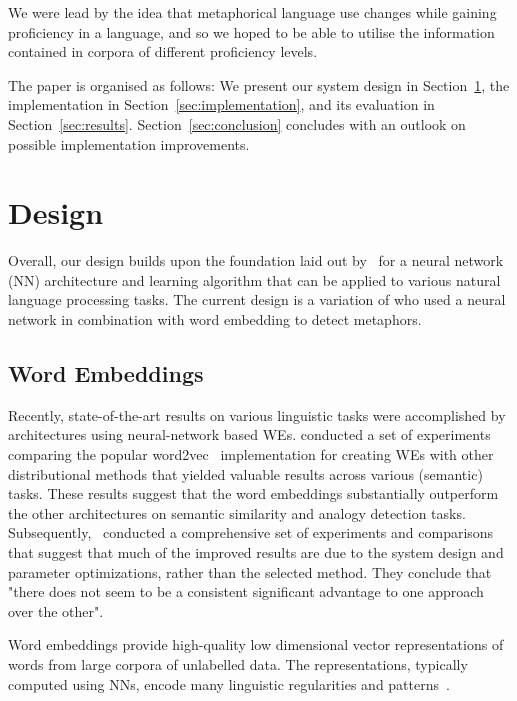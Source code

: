 \documentclass[11pt,a4paper]{article}
\begin{document}
We were lead by the idea that metaphorical language use changes while gaining proficiency in a language, and so we hoped to be able to utilise the information contained in corpora of different proficiency levels.

The paper is organised as follows: We present our system design in
Section~\ref{sec:design}, the implementation in
Section~\ref{sec:implementation}, and its evaluation in
Section~\ref{sec:results}. 
Section~\ref{sec:conclusion} concludes with an outlook on possible
implementation improvements.

\section{Design} %
\label{sec:design}

Overall, our design builds upon the foundation
laid out by~ for a neural network (NN) architecture
and learning algorithm that can be applied to various natural language
processing tasks. The current design is a variation of \cite{W16-1104} who used a neural network in combination with word embedding to detect metaphors.

\subsection{Word Embeddings} %

Recently, state-of-the-art results on various linguistic tasks were
accomplished by architectures using neural-network based WEs.
 conducted a set of experiments comparing the popular
word2vec~\cite{DBLP:journals/corr/abs-1301-3781,arXiv:1310.4546}
implementation for creating WEs with other distributional methods that yielded
valuable results across various (semantic) tasks. 
These results suggest that the word embeddings substantially
outperform the other architectures on semantic similarity and analogy
detection tasks.
Subsequently,~ conducted a comprehensive set of
experiments and comparisons that suggest that much of the improved results are
due to the system design and parameter optimizations, rather than the selected
method.  
They conclude that "there does not seem to be a consistent significant
advantage to one approach over the other".%

Word embeddings provide high-quality low dimensional vector representations of
words from large corpora of unlabelled data. The representations, typically
computed using NNs, encode many linguistic regularities and
patterns~\cite{arXiv:1310.4546}.
\end{document}
